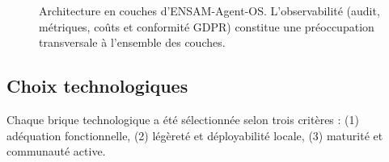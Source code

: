 \documentclass[12pt, a4paper]{article}
\begin{document}
\begin{figure}[H]

\caption{
Architecture en couches d'ENSAM-Agent-OS.
L'observabilité (audit, métriques, coûts et conformité GDPR)
constitue une préoccupation transversale à l'ensemble des couches.
}
\label{fig:architecture_layers}

\end{figure}


\subsection{Choix technologiques}

Chaque brique technologique a été sélectionnée selon trois critères : (1) adéquation fonctionnelle, (2) légèreté et déployabilité locale, (3) maturité et communauté active.
\end{document}
